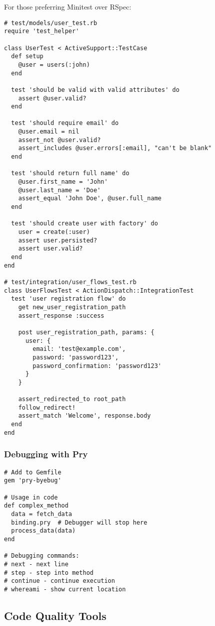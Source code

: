 \documentclass[12pt,a4paper]{article}
\begin{document}
For those preferring Minitest over RSpec:

\begin{lstlisting}
# test/models/user_test.rb
require 'test_helper'

class UserTest < ActiveSupport::TestCase
  def setup
    @user = users(:john)
  end

  test 'should be valid with valid attributes' do
    assert @user.valid?
  end

  test 'should require email' do
    @user.email = nil
    assert_not @user.valid?
    assert_includes @user.errors[:email], "can't be blank"
  end

  test 'should return full name' do
    @user.first_name = 'John'
    @user.last_name = 'Doe'
    assert_equal 'John Doe', @user.full_name
  end

  test 'should create user with factory' do
    user = create(:user)
    assert user.persisted?
    assert user.valid?
  end
end

# test/integration/user_flows_test.rb
class UserFlowsTest < ActionDispatch::IntegrationTest
  test 'user registration flow' do
    get new_user_registration_path
    assert_response :success

    post user_registration_path, params: {
      user: {
        email: 'test@example.com',
        password: 'password123',
        password_confirmation: 'password123'
      }
    }

    assert_redirected_to root_path
    follow_redirect!
    assert_match 'Welcome', response.body
  end
end
\end{lstlisting}

\subsubsection{Debugging with Pry}

\begin{lstlisting}
# Add to Gemfile
gem 'pry-byebug'

# Usage in code
def complex_method
  data = fetch_data
  binding.pry  # Debugger will stop here
  process_data(data)
end

# Debugging commands:
# next - next line
# step - step into method
# continue - continue execution
# whereami - show current location
\end{lstlisting}

\subsection{Code Quality Tools}
\end{document}
